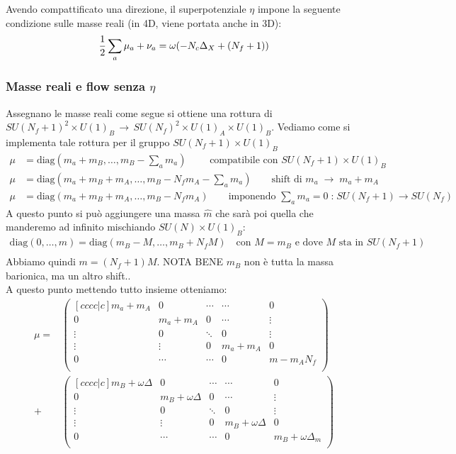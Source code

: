 \documentclass[a4paper,12pt]{article}
\begin{document}
Avendo compattificato una direzione, il superpotenziale $\eta$ impone la seguente condizione sulle masse reali (in 4D, viene portata anche in 3D):
\begin{equation}
  { 1 \over 2 } \sum_a \mu_a + \nu_a  = \omega ( - N_c \Delta_X + (N_f+1))
  \label{eqn:R-symm Anomaly}
\end{equation}
\subsubsection{Masse reali e flow senza $\eta$}

Assegnano le masse reali come segue si ottiene una rottura di $ SU(N_f+1)^2 \times U(1)_B \, \rightarrow \, SU(N_f)^2 \times U(1)_A \times U(1)_B$. Vediamo come si implementa tale rottura per il gruppo $SU(N_f+1) \times U(1)_B$
\begin{align*}
\mu &= \mbox{diag} ( m_a + m_B , \dots, m_B - \sum_a m_a) \qquad \mbox{ compatibile con } SU(N_f+1) \times U(1)_B \\
\mu &= \mbox{diag} ( m_a + m_B + m_A , \dots , m_B - N_f m_A - \sum_a m_a) \qquad \mbox{shift di } m_a \; \rightarrow \; m_a + m_A \\
\mu &= \mbox{diag} ( m_a + m_B + m_A , \dots , m_B - N_f m_A ) \qquad \mbox{imponendo } \sum_a m_a = 0 \;\mbox{:}\; SU(N_f+1) \rightarrow SU(N_f)
\end{align*}
A questo punto si può aggiungere una massa $\hat{m}$ che sarà poi quella che manderemo ad infinito mischiando $SU(N) \times U(1)_B$:
\begin{align*}
\mbox{diag}(0, \dots , m ) = \mbox{diag} (m_B - M, \dots , m_B + N_f M) \quad \mbox{con } M = m_B \mbox{ e dove $M$ sta in } SU(N_f+1) \\
\end{align*}
Abbiamo quindi $ m = (N_f+1) M$. NOTA BENE $m_B$ non è tutta la massa barionica, ma un altro shift..\\
A questo punto mettendo tutto insieme otteniamo:
\begin{align*}
\mu = &
\begin{pmatrix}[c c c c|c]
		m_a + m_A 	& 0 		& \cdots 	& \cdots 	& 0 \\
		0 			 & m_a + m_A & 0 &\cdots & \vdots \\
		\vdots 		& 0 		& \ddots & 0 & \vdots \\
		\vdots & \vdots & 0 & m_a + m_A & 0 \\
		\hline
		0 & \cdots & \cdots & 0 & m  - m_A N_f\\
\end{pmatrix} \\
+ &
\begin{pmatrix}[c c c c|c]
		m_B + \omega \Delta 	& 0 		& \cdots 	& \cdots 	& 0 \\
		0 			 & m_B + \omega \Delta & 0 &\cdots & \vdots \\
		\vdots 		& 0 		& \ddots & 0 & \vdots \\
		\vdots & \vdots & 0 & m_B + \omega \Delta & 0 \\
		\hline
		0 & \cdots & \cdots & 0 &  m_B + \omega \Delta_m\\
\end{pmatrix}
\end{align*}
\end{document}
